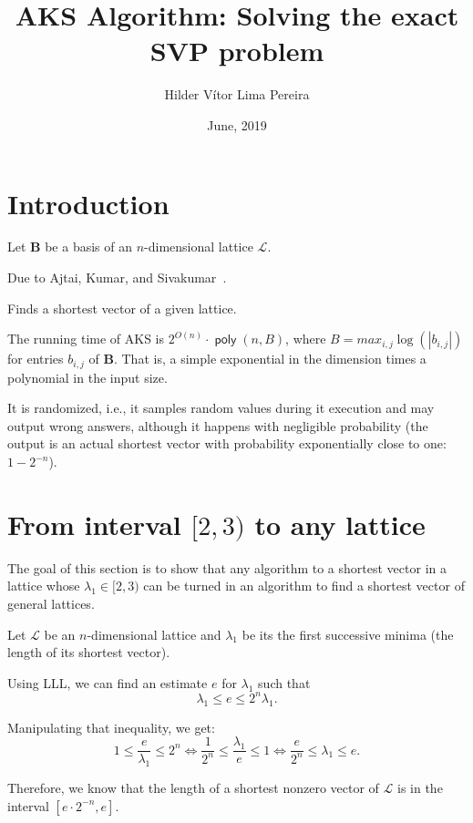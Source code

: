 \documentclass[a4paper,11pt]{article}
\title{AKS Algorithm: Solving the exact SVP problem}
\author{Hilder Vítor Lima Pereira}
\date{June, 2019}
\DeclareMathOperator{\poly}{\textsf{poly}}
\let\vec\mathbf %
\theoremstyle{definition}
\theoremstyle{remark}
\begin{document}
\maketitle


\section{Introduction}

Let $\vec{B}$ be a basis of an $n$-dimensional lattice $\mathcal{L}$.


Due to Ajtai, Kumar, and Sivakumar~\cite{aks2001}. 

Finds a shortest vector of a given lattice.

The running time of AKS is $2^{O(n)}\cdot \poly(n, B)$, where $B = max_{i, 
j}\log(|b_{i,j}|)$ for entries $b_{i,j}$ of $\vec B$. That is, a simple 
exponential in the dimension times a polynomial in the input size.

It is randomized, i.e., it samples random values during it execution and may 
output wrong answers, although it happens with negligible probability (the 
output is an actual shortest vector with probability exponentially close to 
one: $1 - 2^{-n}$).


\section{From interval $[2, 3)$ to any lattice}

The goal of this section is to show that any algorithm to a shortest vector in 
a lattice whose $\lambda_1 \in [2, 3)$ can be turned in an algorithm to find a 
shortest vector of general lattices.

Let $\mathcal{L}$ be an $n$-dimensional lattice and $\lambda_1$ be its the 
first successive minima (the length of its shortest vector).

Using LLL, we can find an estimate $e$ for $\lambda_1$ such that
$$\lambda_1 \le e \le 2^n\lambda_1.$$

Manipulating that inequality, we get:
$$1 \le \frac{e}{\lambda_1} \le 2^n \Leftrightarrow \frac{1}{2^n} \le 
\frac{\lambda_1}{e} \le 1
\Leftrightarrow \frac{e}{2^n} \le \lambda_1 \le e.$$

Therefore, we know that the length of a shortest nonzero vector of 
$\mathcal{L}$ is in the interval $\left[ e\cdot 2^{-n}, e \right]$.
\end{document}
